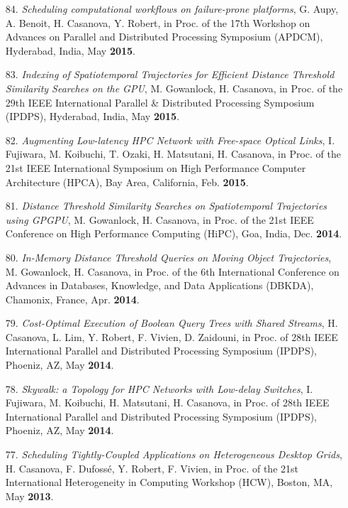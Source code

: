 \begin{enumerate}
\item [84.] {\it Scheduling computational workflows on failure-prone
platforms}, G. Aupy, A. Benoit, H. Casanova, Y.  Robert, in Proc. of
the 17th Workshop on Advances on Parallel and Distributed Processing
Symposium (APDCM), Hyderabad, India, May {\bf 2015}.



\item [83.] {\it Indexing of Spatiotemporal Trajectories for Efficient Distance Threshold Similarity Searches on the GPU}, M. Gowanlock, H. Casanova, 
in Proc. of the 29th IEEE International Parallel \& Distributed Processing Symposium (IPDPS), Hyderabad, India, May {\bf 2015}.


\item [82.] {\it Augmenting Low-latency HPC Network with Free-space Optical Links}, I. Fujiwara, M. Koibuchi, T. Ozaki, H. Matsutani, H. Casanova,
in Proc. of the 21st IEEE International Symposium on High Performance Computer Architecture (HPCA), Bay Area, California, Feb. {\bf 2015}.


\item [81.] {\it Distance Threshold Similarity Searches on Spatiotemporal
Trajectories using GPGPU}, M. Gowanlock, H. Casanova, in Proc. of the 21st
IEEE Conference on High Performance Computing (HiPC), Goa, India,
Dec. {\bf 2014}.

\item [80.] {\it In-Memory Distance Threshold Queries on Moving Object
Trajectories}, M. Gowanlock, H. Casanova, in Proc. of the 6th
International Conference on Advances in Databases, Knowledge, and Data
Applications (DBKDA), Chamonix, France, Apr. {\bf 2014}.

\item [79.] {\it Cost-Optimal Execution of Boolean Query Trees with Shared Streams}, H. Casanova, L. Lim, Y. Robert, F. Vivien, D. Zaidouni, in Proc. of
28th IEEE International Parallel and Distributed Processing Symposium (IPDPS),
Phoeniz, AZ, May {\bf 2014}.

\item [78.] {\it Skywalk: a Topology for HPC Networks with Low-delay Switches}, I. Fujiwara, M. Koibuchi, H. Matsutani, H. Casanova, in Proc. of
28th IEEE International Parallel and Distributed Processing Symposium (IPDPS),
Phoeniz, AZ, May {\bf 2014}.

\item[77.] {\it Scheduling Tightly-Coupled Applications on Heterogeneous Desktop Grids},
H. Casanova, F. Dufoss\'e, Y. Robert, F. Vivien,
in Proc. of 
the 21st International Heterogeneity in Computing Workshop (HCW), Boston, MA, May {\bf 2013}.


\end{enumerate}
